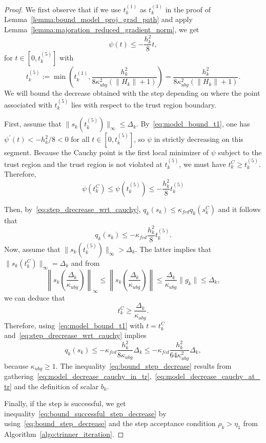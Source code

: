 \begin{proof}
	We first observe that if we use $t_k^{(1)}$ as $t_k^{(3)}$ in the proof of Lemma~\ref{lemma:bound_model_proj_grad_path} and apply Lemma~\ref{lemma:majoration_reduced_gradient_norm}, we get 
	\begin{equation}\label{eq:model_bound_t1}
		\psi(t) \le -\dfrac{h_k^2}{8} t,
	\end{equation}
	for $t \in [0,t_k^{(5)}]$ with \[t_k^{(5)} := \min\left(t_k^{(1)},\dfrac{h_k^2}{8\kappa_{ubg}^2 (\|H_k\|+1)}\right) = \dfrac{h_k^2}{8\kappa_{ubg}^2 (\|H_k\|+1)}.\]
	We will bound the decrease obtained with the step depending on where the point associated with $t_k^{(5)}$ lies with respect to the trust region boundary.
	
	First, assume that $\|s_k(t_k^{(5)})\|_\infty \le \Delta_k$. By~\eqref{eq:model_bound_t1}, one has $\psi^\prime(t) < -h_k^2 /8 < 0$ for all $t \in  [0,t_k^{(5)}]$, so $\psi$ in strictly decreasing on this segment. Because the Cauchy point is the first local minimizer of $\psi$ subject to the trust region and the trust region is not violated at $t_k^{(5)}$, we must have $t_k^C \ge t_k^{(5)}$. Therefore, 
	\[\psi(t_k^C) \le \psi(t_k^{(5)}) \le -\dfrac{h_k^2}{8} t_k^{(5)} \]
	
	Then, by~\eqref{eq:step_drecrease_wrt_cauchy}, $q_k(s_k) \le \kappa_{fcd} q_k(s_k^C)$ and it follows that
	\begin{equation}\label{eq:model_decrease_cauchy_in_tr}
		q_k(s_k) \le -\kappa_{fcd} \frac{h_k^2}{8} t_k^{(5)}.
	\end{equation}
	Now, assume that $\|s_k(t_k^{(5)})\|_\infty > \Delta_k$. The latter implies that $\|s_k(t_k^C)\|_\infty = \Delta_k$ and from
	\begin{equation*}
		\left\|s_k\left(\frac{\Delta_k}{\kappa_{ubg}}\right)\right\|_\infty \le 	\left\|s_k\left(\frac{\Delta_k}{\kappa_{ubg}}\right)\right\| \le \frac{\Delta_k}{\kappa_{ubg}} \|g_k\| \le \Delta_k,
	\end{equation*}
	we can deduce that 
	\begin{equation*}
		t_k^C \ge \frac{\Delta_k}{\kappa_{ubg}}.
	\end{equation*}
	Therefore, using~\eqref{eq:model_bound_t1} with $t=t_k^C$ and~\eqref{eq:step_drecrease_wrt_cauchy} implies
	\begin{equation}\label{eq:model_decrease_cauchy_at_tr}
		q_k(s_k) \le -\kappa_{fcd} \frac{h_k^2}{8\kappa_{ubg}} \Delta_k \le -\kappa_{fcd} \frac{h_k^2}{64\kappa_{ubg}^2} \Delta_k,
	\end{equation} 
	because $\kappa_{ubg} \ge 1.$
	The inequality~\eqref{eq:bound_step_decrease} results from gathering~\eqref{eq:model_decrease_cauchy_in_tr},~\eqref{eq:model_decrease_cauchy_at_tr} and the definition of scalar $b_k$. 
	
	Finally, if the step is successful, we get inequality~\eqref{eq:bound_successful_step_decrease} by using~\eqref{eq:bound_step_decrease} and the step acceptance condition $\rho_k > \eta_1$ from Algorithm~\ref{algo:trinner_iteration}. 
\end{proof}

